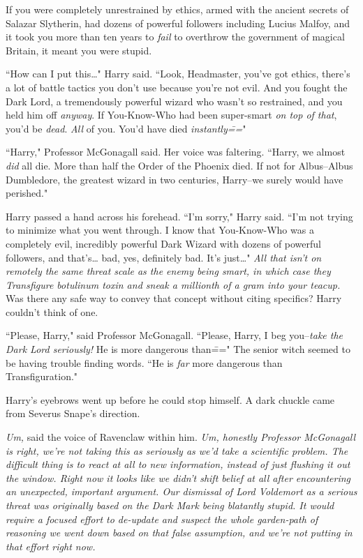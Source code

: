 If you were completely unrestrained by ethics, armed with the ancient secrets of Salazar Slytherin, had dozens of powerful followers including Lucius Malfoy, and it took you more than ten years to \emph{fail} to overthrow the government of magical Britain, it meant you were stupid.

``How can I put this{\ldots}" Harry said. ``Look, Headmaster, you've got ethics, there's a lot of battle tactics you don't use because you're not evil. And you fought the Dark Lord, a tremendously powerful wizard who wasn't so restrained, and you held him off \emph{anyway}. If You-Know-Who had been super-smart \emph{on top of that}, you'd be \emph{dead}. \emph{All} of you. You'd have died \emph{instantly\===}"

``Harry," Professor McGonagall said. Her voice was faltering. ``Harry, we almost \emph{did} all die. More than half the Order of the Phoenix died. If not for Albus\---Albus Dumbledore, the greatest wizard in two centuries, Harry\---we surely would have perished."

Harry passed a hand across his forehead. ``I'm sorry," Harry said. ``I'm not trying to minimize what you went through. I know that You-Know-Who was a completely evil, incredibly powerful Dark Wizard with dozens of powerful followers, and that's{\ldots} bad, yes, definitely bad. It's just{\ldots}" \emph{All that isn't on remotely the same threat scale as the enemy being smart, in which case they Transfigure botulinum toxin and sneak a millionth of a gram into your teacup.} Was there any safe way to convey that concept without citing specifics? Harry couldn't think of one.

``Please, Harry," said Professor McGonagall. ``Please, Harry, I beg you\---\emph{take the Dark Lord seriously!} He is more dangerous than\===" The senior witch seemed to be having trouble finding words. ``He is \emph{far} more dangerous than Transfiguration."

Harry's eyebrows went up before he could stop himself. A dark chuckle came from Severus Snape's direction.

\emph{Um,} said the voice of Ravenclaw within him. \emph{Um, honestly Professor McGonagall is right, we're not taking this as seriously as we'd take a scientific problem. The difficult thing is to react \emph{at all} to new information, instead of just flushing it out the window. Right now it looks like we didn't shift belief \emph{at all} after encountering an unexpected, important argument. Our dismissal of Lord Voldemort as a serious threat \emph{was} originally based on the Dark Mark being blatantly stupid. It would require a focused effort to de-update and suspect the whole garden-path of reasoning we went down based on that false assumption, and we're \emph{not} putting in that effort right now.}

